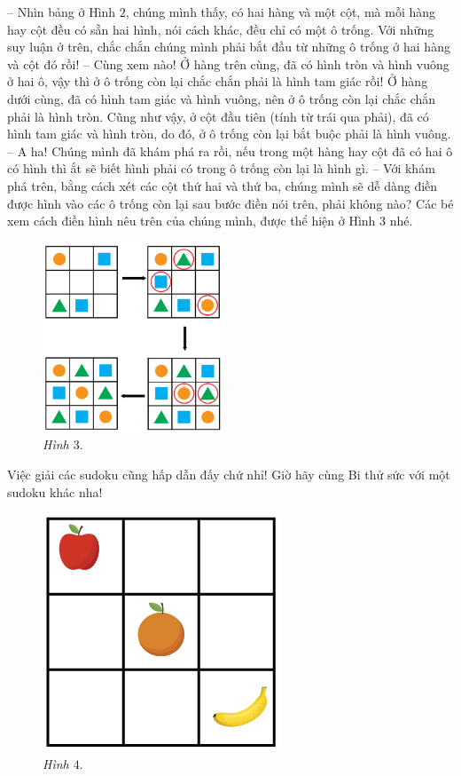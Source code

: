 	\vskip 0.15cm
	-- Nhìn bảng ở Hình $2$, chúng mình thấy, có hai hàng và một cột, mà mỗi hàng hay cột đều có sẵn hai hình, nói cách khác, đều chỉ có một ô trống. Với những suy luận ở trên, chắc chắn chúng mình phải bắt đầu từ những ô trống ở hai hàng và cột đó rồi!
	\vskip 0.15cm
	-- Cùng xem nào! Ở hàng trên cùng, đã có hình tròn và hình vuông ở hai ô, vậy thì ở ô trống còn lại chắc chắn phải là hình tam giác rồi! Ở hàng dưới cùng, đã có hình tam giác và hình vuông, nên ở ô trống còn lại chắc chắn phải là hình tròn. Cũng như vậy, ở cột đầu tiên (tính từ trái qua phải), đã có hình tam giác và hình tròn, do đó, ở ô trống còn lại bắt buộc phải là hình vuông.
	\vskip 0.15cm
	-- A ha! Chúng mình đã khám phá ra rồi, nếu trong một hàng hay cột đã có hai ô có hình thì ắt sẽ biết hình phải có trong ô trống còn lại là hình gì.
	\vskip 0.15cm
	-- Với khám phá trên, bằng cách xét các cột thứ hai và thứ ba, chúng mình sẽ dễ dàng điền được hình vào các ô trống còn lại sau bước điền nói trên, phải không nào?
	\vskip 0.15cm
	Các bé xem cách điền hình nêu trên của chúng mình, được thể hiện ở Hình $3$ nhé.
		\begin{figure}[H]
			\centering
			\vspace*{-10pt}
			\captionsetup{labelformat= empty, justification=centering}
			\includegraphics[width=0.48\textwidth]{hinh3}
			\caption{\small\textit{Hình $3.$}}
			\vspace*{-5pt}
		\end{figure}
	Việc giải các sudoku cũng hấp dẫn đấy chứ nhỉ! Giờ hãy cùng Bi thử sức với một sudoku  khác nha!
	\vskip 0.1cm
	\begin{figure}
		\vspace*{-10pt}
		\centering
		\captionsetup{labelformat=empty, justification=centering}
		\includegraphics[scale=0.4]{hinh4}
		\caption{\textit{\small Hình $4.$}}
		\vspace*{-15pt}
	\end{figure}

